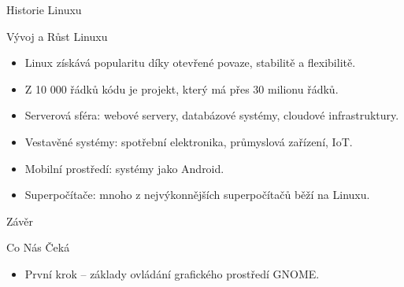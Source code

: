 \documentclass{beamer}
\begin{document}
\begin{frame}{Historie Linuxu}
	\begin{block}{Vývoj a Růst Linuxu}
		\begin{itemize}
   			\item Linux získává popularitu díky otevřené povaze, stabilitě a flexibilitě.
   			\item Z 10 000 řádků kódu je projekt, který má přes 30 milionu řádků.
	        \item Serverová sféra: webové servery, databázové systémy, cloudové infrastruktury.
			\item Vestavěné systémy: spotřební elektronika, průmyslová zařízení, IoT.
			\item Mobilní prostředí: systémy jako Android.
			\item Superpočítače: mnoho z nejvýkonnějších superpočítačů běží na Linuxu.
		\end{itemize}
	\end{block}
\end{frame}

\begin{frame}{Závěr}
	\begin{block}{Co Nás Čeká}
		\begin{itemize}
			\item První krok – základy ovládání grafického prostředí GNOME.
		\end{itemize}
	\end{block}
\end{frame}
\end{document}
